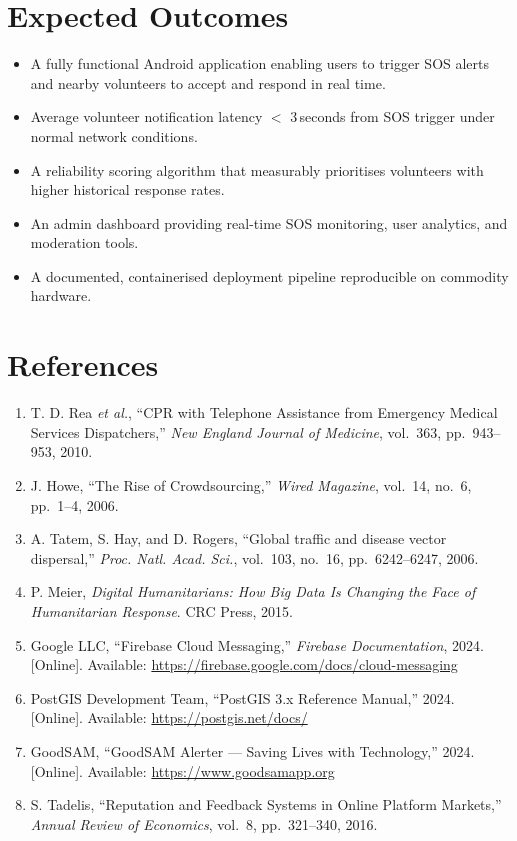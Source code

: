 \documentclass[12pt]{article}
\begin{document}
\section{Expected Outcomes}
\begin{itemize}[nosep, leftmargin=1.4em]
  \item A fully functional Android application enabling users to trigger SOS alerts and nearby volunteers to accept and respond in real time.
  \item Average volunteer notification latency $<$ 3\,seconds from SOS trigger under normal network conditions.
  \item A reliability scoring algorithm that measurably prioritises volunteers with higher historical response rates.
  \item An admin dashboard providing real-time SOS monitoring, user analytics, and moderation tools.
  \item A documented, containerised deployment pipeline reproducible on commodity hardware.
\end{itemize}

\section{References}
\begin{enumerate}[nosep, leftmargin=1.4em]
    \item[\lbrack 1\rbrack] T. D. Rea \textit{et al.}, ``CPR with Telephone Assistance from Emergency Medical Services Dispatchers,'' \textit{New England Journal of Medicine}, vol.~363, pp.~943--953, 2010.
    \item[\lbrack 2\rbrack] J. Howe, ``The Rise of Crowdsourcing,'' \textit{Wired Magazine}, vol.~14, no.~6, pp.~1--4, 2006.
    \item[\lbrack 3\rbrack] A. Tatem, S. Hay, and D. Rogers, ``Global traffic and disease vector dispersal,'' \textit{Proc. Natl. Acad. Sci.}, vol.~103, no.~16, pp.~6242--6247, 2006.
    \item[\lbrack 4\rbrack] P. Meier, \textit{Digital Humanitarians: How Big Data Is Changing the Face of Humanitarian Response}. CRC Press, 2015.
    \item[\lbrack 5\rbrack] Google LLC, ``Firebase Cloud Messaging,'' \textit{Firebase Documentation}, 2024. [Online]. Available: \url{https://firebase.google.com/docs/cloud-messaging}
    \item[\lbrack 6\rbrack] PostGIS Development Team, ``PostGIS 3.x Reference Manual,'' 2024. [Online]. Available: \url{https://postgis.net/docs/}
    \item[\lbrack 7\rbrack] GoodSAM, ``GoodSAM Alerter --- Saving Lives with Technology,'' 2024. [Online]. Available: \url{https://www.goodsamapp.org}
    \item[\lbrack 8\rbrack] S. Tadelis, ``Reputation and Feedback Systems in Online Platform Markets,'' \textit{Annual Review of Economics}, vol.~8, pp.~321--340, 2016.
\end{enumerate}
\end{document}
